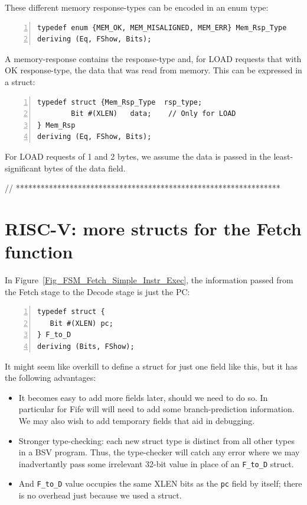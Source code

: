 These different memory response-types can be encoded in an enum type:

\begin{Verbatim}[frame=single, numbers=left]
typedef enum {MEM_OK, MEM_MISALIGNED, MEM_ERR} Mem_Rsp_Type
deriving (Eq, FShow, Bits);
\end{Verbatim}

A memory-response contains the response-type and, for LOAD requests
that with OK response-type, the data that was read from memory.  This
can be expressed in a struct:

\begin{Verbatim}[frame=single, numbers=left]
typedef struct {Mem_Rsp_Type  rsp_type;
		Bit #(XLEN)   data;    // Only for LOAD
} Mem_Rsp
deriving (Eq, FShow, Bits);
\end{Verbatim}

For LOAD requests of 1 and 2 bytes, we assume the data is passed in
the least-significant bytes of the data field.

// ****************************************************************

\section{RISC-V: more structs for the Fetch function}

In Figure~\ref{Fig_FSM_Fetch_Simple_Instr_Exec}, the information
passed from the Fetch stage to the Decode stage is just the PC:

\begin{Verbatim}[frame=single, numbers=left]
typedef struct {
   Bit #(XLEN) pc;
} F_to_D
deriving (Bits, FShow);
\end{Verbatim}


It might seem like overkill to define a struct for just one field like
this, but it has the following advantages:

\begin{itemize}

  \item It becomes easy to add more fields later, should we need to do
    so.  In particular for Fife will will need to add some
    branch-prediction information.  We may also wish to add temporary
    fields that aid in debugging.

  \item Stronger type-checking: each new struct type is distinct from
    all other types in a BSV program.  Thus, the type-checker will
    catch any error where we may inadvertantly pass some irrelevant
    32-bit value in place of an \verb|F_to_D| struct.

  \item And \verb|F_to_D| value occupies the same XLEN bits as the
    \verb|pc| field by itself; there is no overhead just because we
    used a struct.

\end{itemize}

